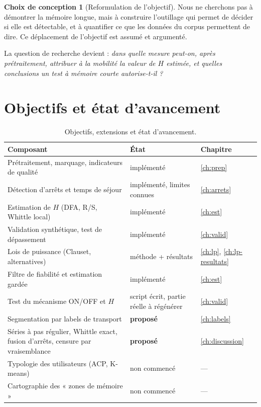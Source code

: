 \documentclass[12pt,a4paper]{report}
\theoremstyle{definition}
\newtheorem{choix}{Choix de conception}[chapter]
\begin{document}
\begin{choix}[Reformulation de l'objectif]
Nous ne cherchons pas à démontrer la mémoire longue, mais à construire l'outillage qui
permet de décider si elle est détectable, et à quantifier ce que les données du corpus
permettent de dire. Ce déplacement de l'objectif est assumé et argumenté.
\end{choix}

La question de recherche devient : \emph{dans quelle mesure peut-on, après prétraitement,
attribuer à la mobilité la valeur de $H$ estimée, et quelles conclusions un test à mémoire
courte autorise-t-il ?}

\section{Objectifs et état d'avancement}

\begin{table}[ht]
\centering
\caption{Objectifs, extensions et état d'avancement.}
\label{tab:avancement}
\small
\begin{tabular}{@{}p{7.4cm}p{4.4cm}p{2.2cm}@{}}
\toprule
Composant & État & Chapitre \\
\midrule
Prétraitement, marquage, indicateurs de qualité & implémenté & \ref{ch:prep} \\
Détection d'arrêts et temps de séjour & implémenté, limites connues & \ref{ch:arrets} \\
Estimation de $H$ (DFA, R/S, Whittle local) & implémenté & \ref{ch:est} \\
Validation synthétique, test de dépassement & implémenté & \ref{ch:valid} \\
Lois de puissance (Clauset, alternatives) & méthode + résultats & \ref{ch:lp}, \ref{ch:lp-resultats} \\
Filtre de fiabilité et estimation gardée & implémenté & \ref{ch:est} \\
Test du mécanisme ON/OFF et $H$ & script écrit, partie réelle à régénérer & \ref{ch:valid} \\
Segmentation par labels de transport & \textbf{proposé} & \ref{ch:labels} \\
Séries à pas régulier, Whittle exact, fusion d'arrêts, censure par vraisemblance & \textbf{proposé} & \ref{ch:discussion} \\
Typologie des utilisateurs (ACP, K-means) & non commencé & --- \\
Cartographie des « zones de mémoire » & non commencé & --- \\
\bottomrule
\end{tabular}
\end{table}
\end{document}
